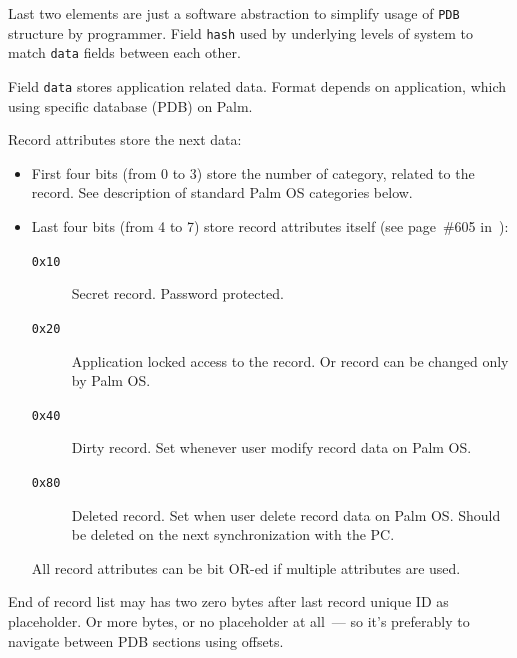\documentclass[a4paper,12pt,oneside]{scrartcl}
\begin{document}
Last two elements are just a software abstraction to simplify usage of
\texttt{PDB} structure by programmer. Field \texttt{hash} used by underlying
levels of system to match \texttt{data} fields between each other.

Field \texttt{data} stores application related data. Format depends on
application, which using specific database (PDB) on Palm.

Record attributes store the next data:
\begin{itemize}
\item First four bits (from 0 to 3) store the number of category, related to the
  record. See description of standard Palm OS categories below.
\item Last four bits (from 4 to 7) store record attributes itself (see
  page~\#605 in~\cite{PalmOSAPIRef}):
  \begin{description}
  \item[\texttt{0x10}] Secret record. Password protected.
  \item[\texttt{0x20}] Application locked access to the record. Or record can be
    changed only by Palm OS.
  \item[\texttt{0x40}] Dirty record. Set whenever user modify record data on
    Palm OS.
  \item[\texttt{0x80}] Deleted record. Set when user delete record data on Palm
    OS. Should be deleted on the next synchronization with the PC.
  \end{description}

  All record attributes can be bit OR-ed if multiple attributes are used.
\end{itemize}

End of record list may has two zero bytes after last record unique ID as
placeholder. Or more bytes, or no placeholder at all~--- so it's preferably to
navigate between PDB sections using offsets.
\end{document}
